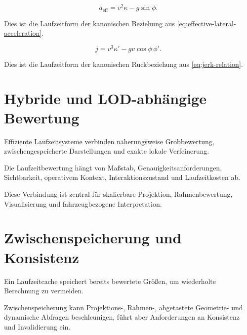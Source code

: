 \begin{definition}
\label{eq:runtime-effective-acceleration}
\[
a_{\mathrm{eff}}
=
v^2\kappa-g\sin\phi.
\]
\end{definition}

Dies ist die Laufzeitform der kanonischen Beziehung aus
\cref{eq:effective-lateral-acceleration}.

\begin{definition}
\label{eq:runtime-jerk}
\[
j
=
v^3\kappa'
-
gv\cos\phi\,\phi'.
\]
\end{definition}

Dies ist die Laufzeitform der kanonischen Ruckbeziehung aus
\cref{eq:jerk-relation}.

\section{Hybride und LOD-abhängige Bewertung}

\begin{principle}
\label{princ:hybrid-runtime}
Effiziente Laufzeitsysteme verbinden näherungsweise Grobbewertung,
zwischengespeicherte Darstellungen und exakte lokale Verfeinerung.
\end{principle}

\begin{definition}
\label{def:lod-evaluation}
Die Laufzeitbewertung hängt von Maßstab, Genauigkeitsanforderungen,
Sichtbarkeit, operativem Kontext, Interaktionszustand und Laufzeitkosten ab.
\end{definition}

Diese Verbindung ist zentral für skalierbare Projektion, Rahmenbewertung,
Visualisierung und fahrzeugbezogene Interpretation.

\section{Zwischenspeicherung und Konsistenz}

\begin{definition}[Laufzeitcache]
\label{def:runtime-cache}
Ein Laufzeitcache speichert bereits bewertete Größen, um wiederholte
Berechnung zu vermeiden.
\end{definition}

Zwischenspeicherung kann Projektions-, Rahmen-, abgetastete Geometrie- und
dynamische Abfragen beschleunigen, führt aber Anforderungen an Konsistenz und
Invalidierung ein.

